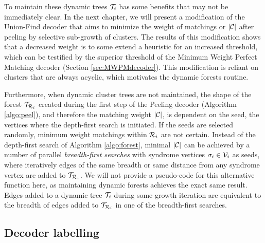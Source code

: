 To maintain these dynamic trees $\mathcal{T}_i$ has some benefits that may not be immediately clear. In the next chapter, we will present a modification of the Union-Find decoder that aims to minimize the weight of matchings or $|\mathcal{C}|$ after peeling by selective sub-growth of clusters. The results of this modification shows that a decreased weight is to some extend a heuristic for an increased threshold, which can be testified by the superior threshold of the Minimum Weight Perfect Matching decoder (Section \ref{sec:MWPMdecoder}). This modification is reliant on clusters that are always acyclic, which motivates the dynamic forests routine. 

Furthermore, when dynamic cluster trees are not maintained, the shape of the forest $\mathcal{T}_{\mathcal{R}_i}$ created during the first step of the Peeling decoder (Algorithm \ref{algo:peel}), and therefore the matching weight $|\mathcal{C}|$, is dependent on the seed, the vertices where the depth-first search is initiated. If the seeds are selected randomly, minimum weight matchings within $\mathcal{R}_i$ are not certain. Instead of the depth-first search of Algorithm \ref{algo:forest}, minimal $|\mathcal{C}|$ can be achieved by a number of parallel \emph{breadth-first searches} with syndrome vertices $\sigma_i \in \mathcal{V}_i$ as seeds, where iteratively edges of the same breadth or same distance from any syndrome vertex are added to $\mathcal{T}_{\mathcal{R}_i}$. We will not provide a pseudo-code for this alternative  function here, as maintaining dynamic forests achieves the exact same result. Edges added to a dynamic tree $\mathcal{T}_i$ during some growth iteration are equivalent to the breadth of edges added to $\mathcal{T}_{\mathcal{R}_i}$ in one of the breadth-first searches. 

\subsection{Decoder labelling}


